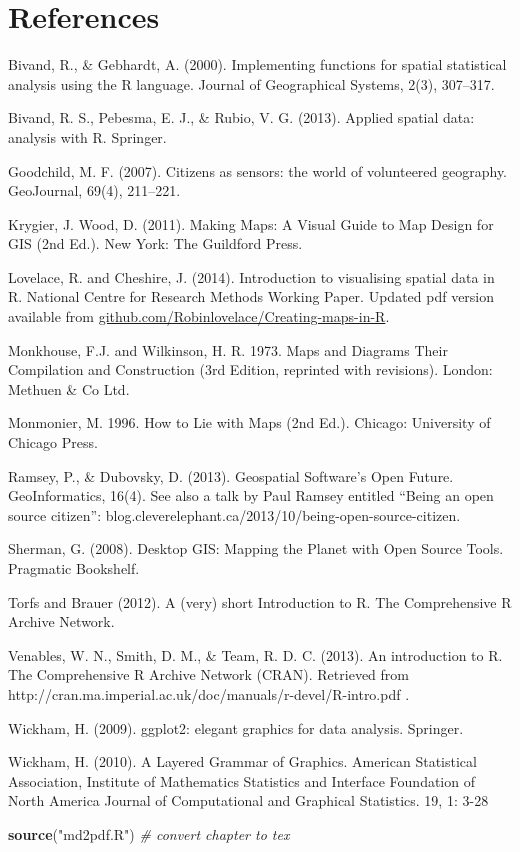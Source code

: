 \documentclass[]{article}
\newenvironment{Shaded}{}{}
\newcommand{\KeywordTok}[1]{\textcolor[rgb]{0.00,0.44,0.13}{\textbf{{#1}}}}
\newcommand{\StringTok}[1]{\textcolor[rgb]{0.25,0.44,0.63}{{#1}}}
\newcommand{\CommentTok}[1]{\textcolor[rgb]{0.38,0.63,0.69}{\textit{{#1}}}}
\newcommand{\NormalTok}[1]{{#1}}
\begin{document}
\section{References}\label{references}

Bivand, R., \& Gebhardt, A. (2000). Implementing functions for spatial
statistical analysis using the R language. Journal of Geographical
Systems, 2(3), 307--317.

Bivand, R. S., Pebesma, E. J., \& Rubio, V. G. (2013). Applied spatial
data: analysis with R. Springer.

Goodchild, M. F. (2007). Citizens as sensors: the world of volunteered
geography. GeoJournal, 69(4), 211--221.

Krygier, J. Wood, D. (2011). Making Maps: A Visual Guide to Map Design
for GIS (2nd Ed.). New York: The Guildford Press.

Lovelace, R. and Cheshire, J. (2014). Introduction to visualising
spatial data in R. National Centre for Research Methods Working Paper.
Updated pdf version available from
\href{https://github.com/Robinlovelace/Creating-maps-in-R}{github.com/Robinlovelace/Creating-maps-in-R}.

Monkhouse, F.J. and Wilkinson, H. R. 1973. Maps and Diagrams Their
Compilation and Construction (3rd Edition, reprinted with revisions).
London: Methuen \& Co Ltd.

Monmonier, M. 1996. How to Lie with Maps (2nd Ed.). Chicago: University
of Chicago Press.

Ramsey, P., \& Dubovsky, D. (2013). Geospatial Software's Open Future.
GeoInformatics, 16(4). See also a talk by Paul Ramsey entitled ``Being
an open source citizen'':
blog.cleverelephant.ca/2013/10/being-open-source-citizen.

Sherman, G. (2008). Desktop GIS: Mapping the Planet with Open Source
Tools. Pragmatic Bookshelf.

Torfs and Brauer (2012). A (very) short Introduction to R. The
Comprehensive R Archive Network.

Venables, W. N., Smith, D. M., \& Team, R. D. C. (2013). An introduction
to R. The Comprehensive R Archive Network (CRAN). Retrieved from
http://cran.ma.imperial.ac.uk/doc/manuals/r-devel/R-intro.pdf .

Wickham, H. (2009). ggplot2: elegant graphics for data analysis.
Springer.

Wickham, H. (2010). A Layered Grammar of Graphics. American Statistical
Association, Institute of Mathematics Statistics and Interface
Foundation of North America Journal of Computational and Graphical
Statistics. 19, 1: 3-28

\begin{Shaded}
\begin{Highlighting}[]
\KeywordTok{source}\NormalTok{(}\StringTok{"md2pdf.R"}\NormalTok{)  }\CommentTok{# convert chapter to tex}
\end{Highlighting}
\end{Shaded}
\end{document}
